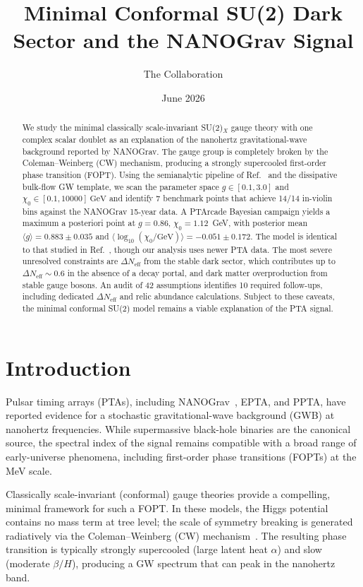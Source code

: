 \documentclass[12pt,a4paper]{article}
\title{Minimal Conformal SU(2) Dark Sector and the NANOGrav Signal}
\author{The \DarkAgents{} Collaboration}
\date{June 2026}
\begin{document}
\maketitle

\begin{abstract}
We study the minimal classically scale-invariant SU(2)$_X$ gauge theory with one complex scalar doublet as an explanation of the nanohertz gravitational-wave background reported by NANOGrav. The gauge group is completely broken by the Coleman--Weinberg (CW) mechanism, producing a strongly supercooled first-order phase transition (FOPT). Using the semianalytic pipeline of Ref.~\cite{Pascoli:2026} and the dissipative bulk-flow GW template, we scan the parameter space $g \in [0.1,3.0]$ and $\chi_0 \in [0.1,10000]~\text{GeV}$ and identify 7 benchmark points that achieve 14/14 in-violin bins against the NANOGrav 15-year data. A PTArcade Bayesian campaign yields a maximum a posteriori point at $g = 0.86$, $\chi_0 = 1.12$~GeV, with posterior mean $\langle g \rangle = 0.883 \pm 0.035$ and $\langle \log_{10}(\chi_0/\text{GeV}) \rangle = -0.051 \pm 0.172$. The model is identical to that studied in Ref.~\cite{Borah:2021}, though our analysis uses newer PTA data. The most severe unresolved constraints are $\Delta N_{\text{eff}}$ from the stable dark sector, which contributes up to $\Delta N_{\text{eff}} \sim 0.6$ in the absence of a decay portal, and dark matter overproduction from stable gauge bosons. An audit of 42 assumptions identifies 10 required follow-ups, including dedicated $\Delta N_{\text{eff}}$ and relic abundance calculations. Subject to these caveats, the minimal conformal SU(2) model remains a viable explanation of the PTA signal.
\end{abstract}

\section{Introduction}
\label{sec:intro}

Pulsar timing arrays (PTAs), including NANOGrav~\cite{Agazie:2023}, EPTA, and PPTA, have reported evidence for a stochastic gravitational-wave background (GWB) at nanohertz frequencies. While supermassive black-hole binaries are the canonical source, the spectral index of the signal remains compatible with a broad range of early-universe phenomena, including first-order phase transitions (FOPTs) at the MeV scale.

Classically scale-invariant (conformal) gauge theories provide a compelling, minimal framework for such a FOPT. In these models, the Higgs potential contains no mass term at tree level; the scale of symmetry breaking is generated radiatively via the Coleman--Weinberg (CW) mechanism~\cite{Coleman:1973}. The resulting phase transition is typically strongly supercooled (large latent heat $\alpha$) and slow (moderate $\beta/H$), producing a GW spectrum that can peak in the nanohertz band.
\end{document}
